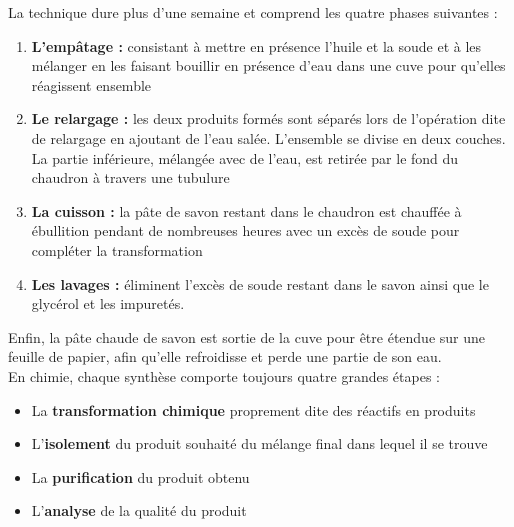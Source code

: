 \documentclass[a4paper,11pt,fleqn]{article}%
\begin{document}
La technique dure plus d'une semaine et comprend les quatre phases suivantes :
\begin{enumerate}
	\item \textbf{L'empâtage :} consistant à mettre en présence l'huile et la soude et à les mélanger en les faisant bouillir en présence d'eau dans une cuve pour qu'elles réagissent ensemble
	\item \textbf{Le relargage :} les deux produits formés sont séparés lors de l'opération dite de relargage en ajoutant de l'eau salée. L'ensemble se divise en deux couches. La partie inférieure, mélangée avec de l'eau, est retirée par le fond du chaudron à travers une tubulure
	\item \textbf{La cuisson :} la pâte de savon restant dans le chaudron est chauffée à ébullition pendant de nombreuses heures avec un excès de soude pour compléter la transformation
	\item \textbf{Les lavages :} éliminent l'excès de soude restant dans le savon ainsi que le glycérol et les impuretés.
\end{enumerate}
\noindent \begin{minipage}[t]{.5\linewidth}

	Enfin, la pâte chaude de savon est sortie de la cuve pour être étendue sur une feuille de papier, afin qu'elle refroidisse et perde une partie de son eau.\\
	En chimie, chaque synthèse comporte toujours quatre grandes étapes : 
	\begin{itemize}
		\item La \textbf{transformation chimique} proprement dite des réactifs en produits
		\item L'\textbf{isolement} du produit souhaité du mélange final dans lequel il se trouve
		\item La \textbf{purification} du produit obtenu
		\item L'\textbf{analyse} de la qualité du produit
	\end{itemize}	
\end{minipage}
\end{document}
